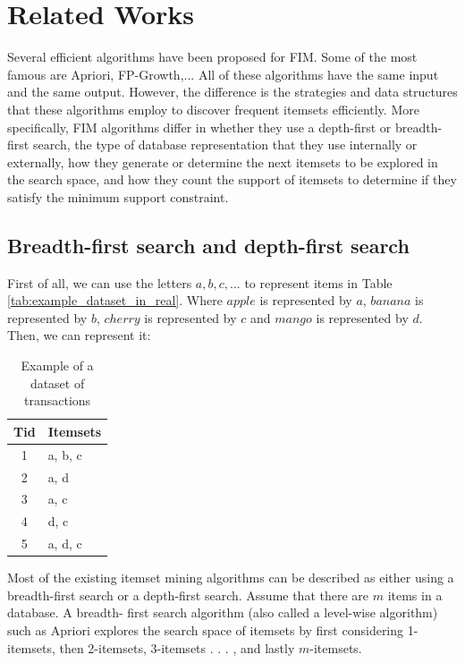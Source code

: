 \section{Related Works}
Several efficient algorithms have been proposed for
FIM. Some of the most famous are Apriori\cite{hegland}, FP-Growth\cite{fp_growth},...
All of these algorithms have the same input and the same output. However, the difference is
the strategies and data structures that these algorithms employ to discover frequent itemsets
efficiently. More specifically, FIM algorithms differ in whether they use a depth-first or
breadth-first search, the type of database representation that they use internally or
externally, how they generate or determine the next itemsets to be explored in the search
space, and how they count the support of itemsets to determine if they satisfy the
minimum support constraint.

\subsection{Breadth-first search and depth-first search}
First of all, we can use the letters $a, b, c,...$ to represent items in Table \ref{tab:example_dataset_in_real}.
Where $apple$ is represented by $a$, $banana$ is represented by $b$, $cherry$ is represented by $c$ and $mango$ is represented by $d$.
Then, we can represent it:
\begin{table}[H]
    \centering
    \caption{Example of a dataset of transactions}
    \label{tab:example_dataset_in_real_encode}
    \begin{tabular}{|c|l|}
        \hline
        \textbf{Tid} & \textbf{Itemsets} \\
        \hline
        1            & a, b, c           \\
        2            & a, d              \\
        3            & a, c              \\
        4            & d, c              \\
        5            & a, d, c           \\
        \hline
    \end{tabular}
\end{table}

Most of the existing itemset mining algorithms can be described as either using a breadth-first
search or a depth-first search. Assume that there are $m$ items in a database. A breadth-
first search algorithm (also called a level-wise algorithm) such as Apriori\cite{hegland} explores the search
space of itemsets by first considering 1-itemsets, then 2-itemsets, 3-itemsets . . . , and lastly
$m$-itemsets.

